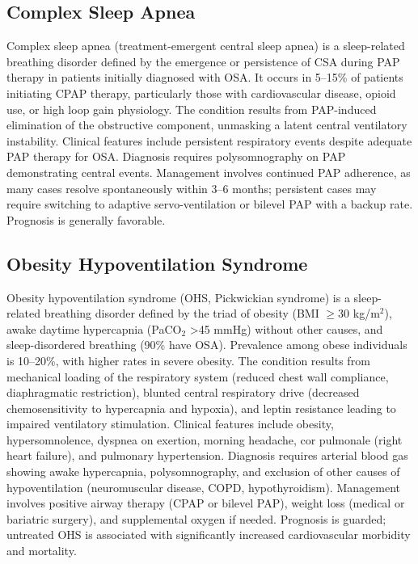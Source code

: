 \subsection{Complex Sleep Apnea}
\label{sec:Complex Sleep Apnea}
Complex sleep apnea (treatment-emergent central sleep apnea) is a sleep-related breathing disorder defined by the emergence or persistence of CSA during PAP therapy in patients initially diagnosed with OSA. It occurs in 5--15\% of patients initiating CPAP therapy, particularly those with cardiovascular disease, opioid use, or high loop gain physiology. The condition results from PAP-induced elimination of the obstructive component, unmasking a latent central ventilatory instability. Clinical features include persistent respiratory events despite adequate PAP therapy for OSA. Diagnosis requires polysomnography on PAP demonstrating central events. Management involves continued PAP adherence, as many cases resolve spontaneously within 3--6 months; persistent cases may require switching to adaptive servo-ventilation or bilevel PAP with a backup rate. Prognosis is generally favorable.

\subsection{Obesity Hypoventilation Syndrome}
\label{sec:Obesity Hypoventilation Syndrome}
Obesity hypoventilation syndrome (OHS, Pickwickian syndrome) is a sleep-related breathing disorder defined by the triad of obesity (BMI $\ge$30 kg/m$^2$), awake daytime hypercapnia (PaCO$_2$ >45 mmHg) without other causes, and sleep-disordered breathing (90\% have OSA). Prevalence among obese individuals is 10--20\%, with higher rates in severe obesity. The condition results from mechanical loading of the respiratory system (reduced chest wall compliance, diaphragmatic restriction), blunted central respiratory drive (decreased chemosensitivity to hypercapnia and hypoxia), and leptin resistance leading to impaired ventilatory stimulation. Clinical features include obesity, hypersomnolence, dyspnea on exertion, morning headache, cor pulmonale (right heart failure), and pulmonary hypertension. Diagnosis requires arterial blood gas showing awake hypercapnia, polysomnography, and exclusion of other causes of hypoventilation (neuromuscular disease, COPD, hypothyroidism). Management involves positive airway therapy (CPAP or bilevel PAP), weight loss (medical or bariatric surgery), and supplemental oxygen if needed. Prognosis is guarded; untreated OHS is associated with significantly increased cardiovascular morbidity and mortality.

